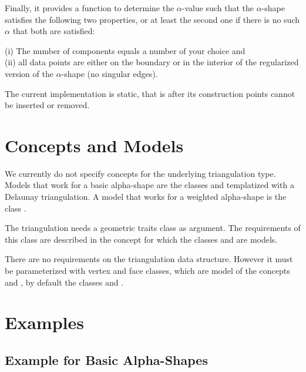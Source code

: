 Finally, it provides a function to determine the $\alpha$-value
such that the $\alpha$-shape  satisfies the following two properties,
or at least the second one if there is no such $\alpha$ that both
are satisfied:

(i) The number of components equals a number of your choice and\\
(ii) all data points are either on the boundary or in the interior of the regularized version of 
the $\alpha$-shape (no singular edges).

\smallskip
The current implementation is static, that is after its construction
points cannot be inserted or removed.

\section{Concepts and Models\label{I1_SectDtClass2D}}


We currently do not specify concepts for the underlying triangulation
type. Models that work for a basic alpha-shape are the classes
 and 
 templatized with a Delaunay
triangulation. A model that works for a weighted alpha-shape is 
the class .

The triangulation needs a geometric traits class as argument.
The requirements of this class are described in the 
concept  for which
the classes 
and  are models.

There are no requirements on the triangulation data structure.
However it must be parameterized with 
vertex and face classes, which are model of the concepts
 and ,
by default the classes  
and .





\section{Examples}
\subsection{Example for Basic Alpha-Shapes\label{I1_SectClassicAS2D}}

